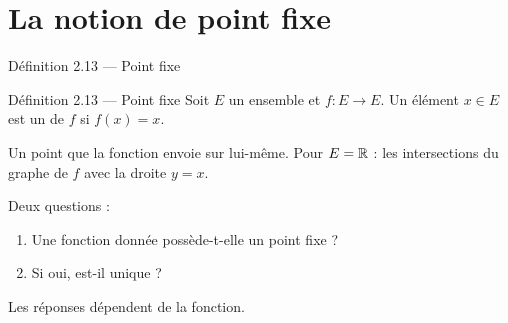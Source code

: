 \section{La notion de point fixe}

\begin{frame}{Définition 2.13 --- Point fixe}
  \begin{Enonce}{Définition 2.13 --- Point fixe}
    Soit $E$ un ensemble et $f:E\to E$. Un élément $x\in E$ est un
     de $f$ si $f(x)=x$.
  \end{Enonce}
  \vspace{4pt}
  \small Un point que la fonction envoie sur lui-même. Pour $E=\operatorname{\mathbb{R}}$ : les
  intersections du graphe de $f$ avec la droite $y=x$.
  \vspace{6pt}

  Deux questions :
  \begin{enumerate}
    \item Une fonction donnée possède-t-elle un point fixe ?
    \item Si oui, est-il unique ?
  \end{enumerate}
  Les réponses dépendent de la fonction.
\end{frame}

